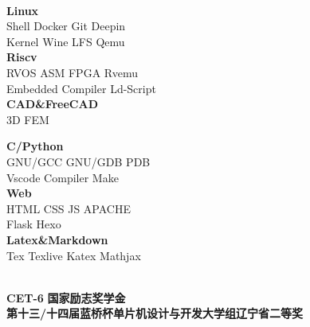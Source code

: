 \documentclass{ctexart}
\begin{document}
\begin{center}
    \hrulefill \\
    \begin{minipage}[t]{18em}
        \centering
        \textbf{Linux} \\
        Shell \quad Docker \quad Git \quad Deepin \\
        Kernel \quad Wine \quad LFS \quad Qemu \\
        
        \textbf{Riscv} \\
        RVOS \quad ASM \quad FPGA \quad Rvemu \\
        Embedded \quad Compiler \quad Ld-Script \\
        \textbf{CAD\&FreeCAD} \\
        3D \quad FEM \\
    \end{minipage}
    \quad 
    \begin{minipage}[t]{18em}
        \centering
        \textbf{C/Python} \\
        GNU/GCC \quad GNU/GDB \quad PDB \\
        Vscode \quad Compiler \quad Make \\
        \textbf{Web} \\
        HTML \quad CSS \quad JS \quad APACHE \\
        Flask \quad Hexo \\
        \textbf{Latex\&Markdown}\\
        Tex \quad Texlive \quad Katex \quad Mathjax \\
    \end{minipage}
    \quad
\end{center}

\begin{center}
    \hrulefill \\
    \textbullet \textbf{CET-6 } \qquad 
    \textbullet \textbf{国家励志奖学金}\\
    \textbullet \textbf{第十三/十四届蓝桥杯单片机设计与开发大学组辽宁省二等奖}
\end{center}
\end{document}
